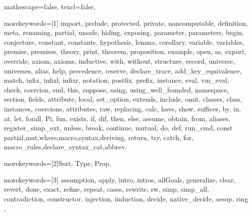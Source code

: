 
 {

mathescape=false,
texcl=false,

morekeywords=[1]{
import, prelude, protected, private, noncomputable, definition, meta, renaming, partial, unsafe,
hiding, exposing, parameter, parameters, begin, conjecture, constant, constants,
hypothesis, lemma, corollary, variable, variables, premise, premises, theory,
print, theorem, proposition, example,
open, as, export, override, axiom, axioms, inductive, with, without,
structure, record, universe, universes,
alias, help, precedence, reserve, declare_trace, add_key_equivalence,
match, infix, infixl, infixr, notation, postfix, prefix, instance,
eval, vm_eval, check, coercion, end, this, suppose,
using, using_well_founded, namespace, section, fields,
attribute, local, set_option, extends, include, omit, classes, class,
instances, coercions, attributes, raw, replacing,
calc, have, show, suffices, by, in, at, let, forall, Pi, fun,
exists, if, dif, then, else, assume, obtain, from, aliases, register_simp_ext, unless, break, continue,
mutual, do, def, run_cmd, const
partial,mut,where,macro,syntax,deriving, return, try, catch, for, macro_rules,declare_syntax_cat,abbrev},

morekeywords=[2]{Sort, Type, Prop},

morekeywords=[3]{
assumption,
apply, intro, intros, allGoals,
generalize, clear, revert, done, exact,
refine, repeat, cases, rewrite, rw,
simp, simp_all, contradiction,
constructor, injection,
induction, decide, native_decide, aesop, ring
},


}
